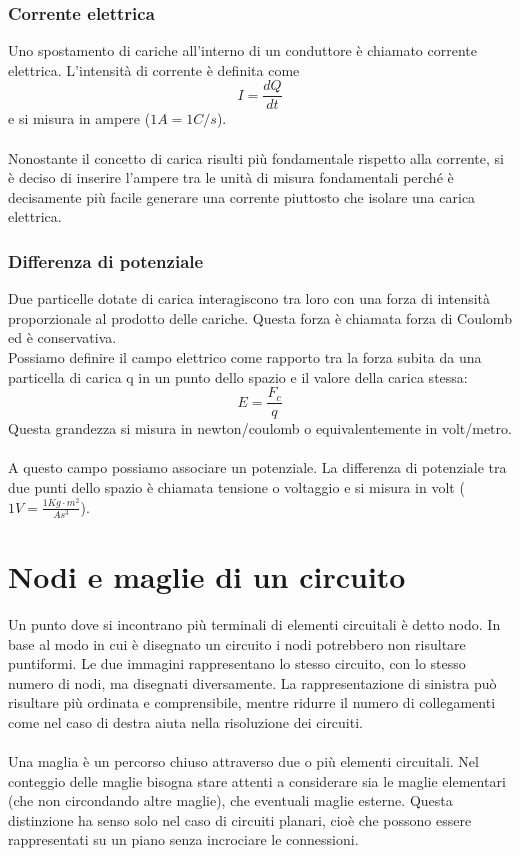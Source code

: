 \documentclass{article}
\begin{document}
\subsubsection{Corrente elettrica}
Uno spostamento di cariche all'interno di un conduttore è chiamato corrente elettrica. L'intensità di corrente è definita come
$$ I=\frac{dQ}{dt} $$
e si misura in ampere ($1A=1C/s$).\\\\
Nonostante il concetto di carica risulti più fondamentale rispetto alla corrente, si è deciso di inserire l'ampere tra le unità di misura fondamentali perché è decisamente più facile generare una corrente piuttosto che isolare una carica elettrica.

\subsubsection{Differenza di potenziale}
Due particelle dotate di carica interagiscono tra loro con una forza di intensità proporzionale al prodotto delle cariche. Questa forza è chiamata forza di Coulomb ed è conservativa.\\
Possiamo definire il campo elettrico come rapporto tra la forza subita da una particella di carica q in un punto dello spazio e il valore della carica stessa:
$$ E=\frac{F_c}{q} $$
Questa grandezza si misura in newton/coulomb o equivalentemente in volt/metro.\\\\
A questo campo possiamo associare un potenziale. La differenza di potenziale tra due punti dello spazio è chiamata tensione o voltaggio e si misura in volt ($1V= \frac{1Kg\cdot m^2}{A s^3}$).








\newpage
\section{Nodi e maglie di un circuito}
Un punto dove si incontrano più terminali di elementi circuitali è detto nodo.
In base al modo in cui è disegnato un circuito i nodi potrebbero non risultare puntiformi. Le due immagini rappresentano lo stesso circuito, con lo stesso numero di nodi, ma disegnati diversamente. La rappresentazione di sinistra può risultare più ordinata e comprensibile, mentre ridurre il numero di collegamenti come nel caso di destra aiuta nella risoluzione dei circuiti.\\\\
Una maglia è un percorso chiuso attraverso due o più elementi circuitali.
Nel conteggio delle maglie bisogna stare attenti a considerare sia le maglie elementari (che non circondando altre maglie), che eventuali maglie esterne. Questa distinzione ha senso solo nel caso di circuiti planari, cioè che possono essere rappresentati su un piano senza incrociare le connessioni.
\end{document}
